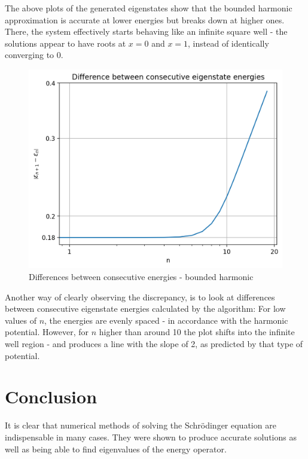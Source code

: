 \documentclass[11pt]{article}
\begin{document}
The above plots of the generated eigenstates show that the bounded
harmonic approximation is accurate at lower energies but breaks down
at higher ones.
There, the system effectively starts behaving like an infinite
square well - 
the solutions appear to have roots at $x=0$ and $x=1$, instead of identically 
converging to 0.

\begin{figure}
  \vspace{-1.1cm}
  \centering
  \includegraphics[width=0.7\linewidth]{diff_energies.png}
  \captionsetup{width=0.8\linewidth}
  \vspace{-.4cm}
  \caption{Differences between consecutive energies - bounded harmonic}
\end{figure}

\vspace{.5cm}

Another way of clearly observing the discrepancy, is to look at differences between
consecutive eigenstate energies calculated by the algorithm: 
For low values of $n$, the energies are evenly spaced - in accordance with the 
harmonic potential. However, for $n$ higher than around 10 the plot shifts into the
infinite well region - and produces a line with the slope of 2, as predicted by
that type of potential.

\vspace{1.3cm}

\section{Conclusion}

It is clear that numerical methods of solving the Schr{\"o}dinger
equation are indispensable in many cases. They were shown to produce
accurate solutions as well as being able to find eigenvalues of the
energy operator.
\end{document}
